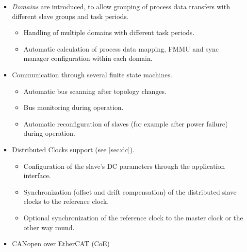 \documentclass[a4paper,12pt,BCOR6mm,bibtotoc,idxtotoc]{scrbook}
\begin{document}
\begin{itemize}
\item \textit{Domains} are introduced, to allow grouping of process
  data transfers with different slave groups and task periods.

  \begin{itemize}

  \item Handling of multiple domains with different task periods.

  \item Automatic calculation of process data mapping, FMMU and sync manager
  configuration within each domain.

  \end{itemize}

\item Communication through several finite state machines.

  \begin{itemize}

  \item Automatic bus scanning after topology changes.

  \item Bus monitoring during operation.

  \item Automatic reconfiguration of slaves (for example after power failure)
  during operation.

  \end{itemize}

\item Distributed Clocks support (see \autoref{sec:dc}).

  \begin{itemize}

  \item Configuration of the slave's DC parameters through the application
  interface.

  \item Synchronization (offset and drift compensation) of the distributed
  slave clocks to the reference clock.

  \item Optional synchronization of the reference clock to the master clock or
  the other way round.

  \end{itemize}

\item CANopen over EtherCAT (CoE)

  \begin{itemize}


\end{itemize}
\end{itemize}
\end{document}
